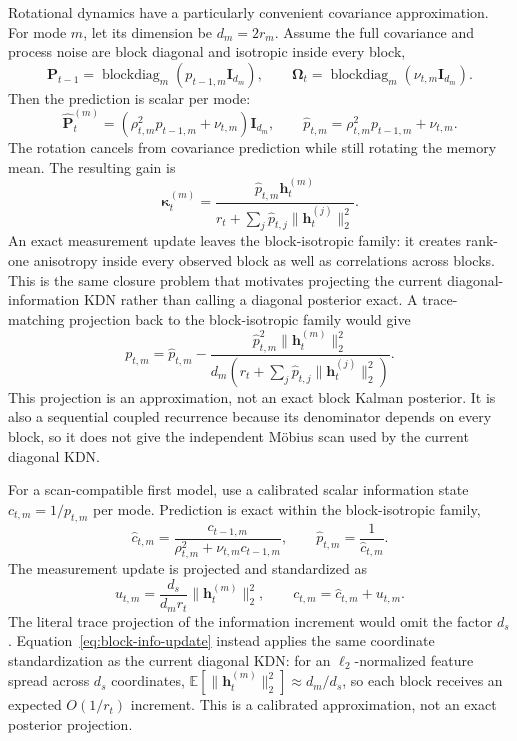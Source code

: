 \documentclass[11pt]{article}
\newcommand{\ve}[1]{\boldsymbol{#1}}
\newcommand{\I}{\ve{I}}
\DeclareMathOperator{\blockdiag}{blockdiag}
\begin{document}
Rotational dynamics have a particularly convenient covariance approximation. For mode $m$,
let its dimension be $d_m=2r_m$. Assume the full covariance and process noise are block
diagonal and isotropic inside every block,
\begin{equation}
  \ve{P}_{t-1}
  =\blockdiag_m(p_{t-1,m}\I_{d_m}),
  \qquad
  \ve{\Omega}_t
  =\blockdiag_m(\nu_{t,m}\I_{d_m}).
\end{equation}
Then the prediction is scalar per mode:
\begin{equation}
  \widehat{\ve{P}}_t^{(m)}
  =\left(\rho_{t,m}^2p_{t-1,m}+\nu_{t,m}\right)\I_{d_m},
  \qquad
  \widehat p_{t,m}=\rho_{t,m}^2p_{t-1,m}+\nu_{t,m}.
  \label{eq:block-isotropic-predict}
\end{equation}
The rotation cancels from covariance prediction while still rotating the memory mean. The
resulting gain is
\begin{equation}
  \ve{\kappa}_t^{(m)}
  =\frac{\widehat p_{t,m}\ve{h}_t^{(m)}}
  {r_t+\sum_j\widehat p_{t,j}\|\ve{h}_t^{(j)}\|_2^2}.
  \label{eq:block-isotropic-gain}
\end{equation}
An exact measurement update leaves the block-isotropic family: it creates rank-one anisotropy
inside every observed block as well as correlations across blocks. This is the same closure
problem that motivates projecting the current diagonal-information KDN rather than calling a
diagonal posterior exact. A trace-matching projection back to the block-isotropic family would
give
\begin{equation}
  p_{t,m}
  =\widehat p_{t,m}
   -\frac{\widehat p_{t,m}^2\|\ve{h}_t^{(m)}\|_2^2}
    {d_m\left(r_t+\sum_j\widehat p_{t,j}
    \|\ve{h}_t^{(j)}\|_2^2\right)}.
  \label{eq:block-isotropic-project}
\end{equation}
This projection is an approximation, not an exact block Kalman posterior. It is also a
sequential coupled recurrence because its denominator depends on every block, so it does not
give the independent M\"obius scan used by the current diagonal KDN.

For a scan-compatible first model, use a calibrated scalar information state
$c_{t,m}=1/p_{t,m}$ per mode. Prediction is exact within the block-isotropic family,
\begin{equation}
  \widehat c_{t,m}
  =\frac{c_{t-1,m}}
   {\rho_{t,m}^2+\nu_{t,m}c_{t-1,m}},
  \qquad
  \widehat p_{t,m}=\frac{1}{\widehat c_{t,m}}.
  \label{eq:block-info-predict}
\end{equation}
The measurement update is projected and standardized as
\begin{equation}
  u_{t,m}
  =\frac{d_s}{d_m r_t}\|\ve{h}_t^{(m)}\|_2^2,
  \qquad
  c_{t,m}=\widehat c_{t,m}+u_{t,m}.
  \label{eq:block-info-update}
\end{equation}
The literal trace projection of the information increment would omit the factor $d_s$.
Equation~\eqref{eq:block-info-update} instead applies the same coordinate standardization as
the current diagonal KDN: for an $\ell_2$-normalized feature spread across $d_s$ coordinates,
$\mathbb{E}[\|\ve{h}_t^{(m)}\|_2^2]\approx d_m/d_s$, so each block receives an expected $O(1/r_t)$
increment. This is a calibrated approximation, not an exact posterior projection.
\end{document}
